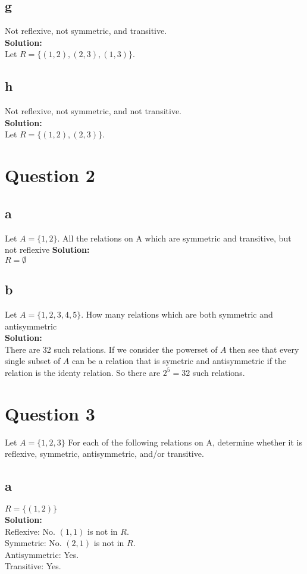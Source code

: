 \documentclass{article}
\begin{document}
\subsection*{g}
Not reflexive, not symmetric, and transitive.\\
\textbf{Solution:}\\
Let $R = \{(1,2), (2,3), (1,3)\}$.
\subsection*{h}
Not reflexive, not symmetric, and not transitive.\\
\textbf{Solution:}\\
Let $R = \{(1,2), (2,3)\}$.

\section*{Question 2}
\subsection*{a}
Let $A= \{ 1,2\}$. All the relations on A which are symmetric and transitive, but not reflexive
\textbf{Solution:}\\
$R = \emptyset$ 
\subsection*{b}
Let $A= \{ 1,2,3,4,5\}$. How many relations which are both symmetric and antisymmetric \\
\textbf{Solution:}\\ 
There are 32 such relations. If we consider the powerset of $A$ then see that every single subset of $A$ can be a relation that is symetric and antisymmetric if the relation is the identy relation. So there are $2^5 = 32$ such relations.
\section*{Question 3}
Let $A = \{1,2,3\}$ For each of the following relations on A, determine whether it is reflexive, symmetric, antisymmetric, and/or transitive.
\subsection*{a}
$R = \{(1,2)\}$\\
\textbf{Solution:}\\
Reflexive: No. $(1,1)$ is not in $R$.\\
Symmetric: No. $(2,1)$ is not in $R$.\\
Antisymmetric: Yes. \\
Transitive: Yes. 
\end{document}
